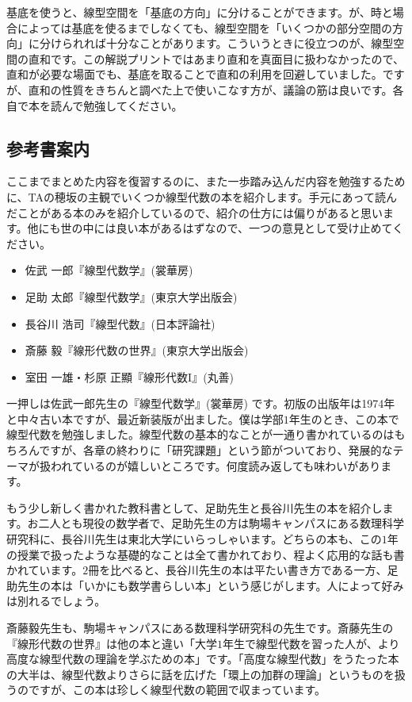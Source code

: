 基底を使うと、線型空間を「基底の方向」に分けることができます。が、時と場合によっては基底を使るまでしなくても、線型空間を「いくつかの部分空間の方向」に分けられれば十分なことがあります。こういうときに役立つのが、線型空間の直和です。この解説プリントではあまり直和を真面目に扱わなかったので、直和が必要な場面でも、基底を取ることで直和の利用を回避していました。ですが、直和の性質をきちんと調べた上で使いこなす方が、議論の筋は良いです。各自で本を読んで勉強してください。

\subsection{参考書案内}

ここまでまとめた内容を復習するのに、また一歩踏み込んだ内容を勉強するために、TAの穂坂の主観でいくつか線型代数の本を紹介します。手元にあって読んだことがある本のみを紹介しているので、紹介の仕方には偏りがあると思います。他にも世の中には良い本があるはずなので、一つの意見として受け止めてください。

\begin{itemize}
\item 佐武 一郎『線型代数学』(裳華房)
\item 足助 太郎『線型代数学』(東京大学出版会)
\item 長谷川 浩司『線型代数』(日本評論社)
\item 斎藤 毅『線形代数の世界』(東京大学出版会)
\item 室田 一雄・杉原 正顯『線形代数I』(丸善)
\end{itemize}

一押しは佐武一郎先生の『線型代数学』(裳華房) です。初版の出版年は1974年と中々古い本ですが、最近新装版が出ました。僕は学部$1$年生のとき、この本で線型代数を勉強しました。線型代数の基本的なことが一通り書かれているのはもちろんですが、各章の終わりに「研究課題」という節がついており、発展的なテーマが扱われているのが嬉しいところです。何度読み返しても味わいがあります。

もう少し新しく書かれた教科書として、足助先生と長谷川先生の本を紹介します。お二人とも現役の数学者で、足助先生の方は駒場キャンパスにある数理科学研究科に、長谷川先生は東北大学にいらっしゃいます。どちらの本も、この$1$年の授業で扱ったような基礎的なことは全て書かれており、程よく応用的な話も書かれています。$2$冊を比べると、長谷川先生の本は平たい書き方である一方、足助先生の本は「いかにも数学書らしい本」という感じがします。人によって好みは別れるでしょう。

斎藤毅先生も、駒場キャンパスにある数理科学研究科の先生です。斎藤先生の『線形代数の世界』は他の本と違い「大学$1$年生で線型代数を習った人が、より高度な線型代数の理論を学ぶための本」です。「高度な線型代数」をうたった本の大半は、線型代数よりさらに話を広げた「環上の加群の理論」というものを扱うのですが、この本は珍しく線型代数の範囲で収まっています。

